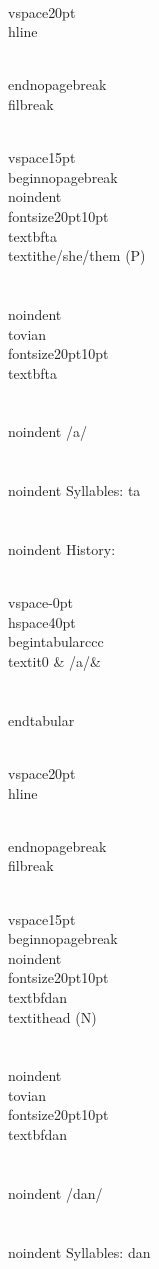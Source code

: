 \\vspace{20pt}\\hline

\\end{nopagebreak}
\\filbreak



\\vspace{15pt}
\\begin{nopagebreak}
\\noindent{\\fontsize{20pt}{10pt}\\textbf{ta} } \\textit{he/she/them} (P)\\\\
\\noindent {\\tovian \\fontsize{20pt}{10pt} \\textbf{ta} }\\\\
\\noindent /{}{\textprimstress}a/\\\\
\\noindent Syllables: ta\\\\


\\noindent History:

\\vspace{-0pt}
\\hspace{40pt}
\\begin{tabular}{ccc}
\\textit{0} & /{}a/& \\\\
\\end{tabular}

\\vspace{20pt}\\hline

\\end{nopagebreak}
\\filbreak



\\vspace{15pt}
\\begin{nopagebreak}
\\noindent{\\fontsize{20pt}{10pt}\\textbf{dan} } \\textit{head} (N)\\\\
\\noindent {\\tovian \\fontsize{20pt}{10pt} \\textbf{dan} }\\\\
\\noindent /d{\textprimstress}an/\\\\
\\noindent Syllables: dan\\\\


